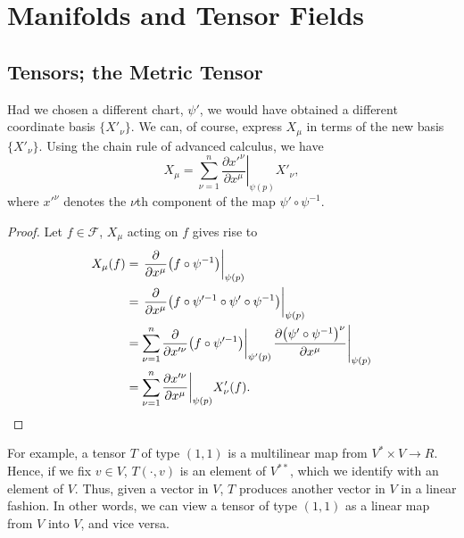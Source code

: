 \documentclass{note}
\numberwithin{equation}{chapter}
\newcommand{\vat}[2]{\left.#1\right\rvert_{#2}}
\newcommand{\pdv}[2]{\frac{\partial #1}{\partial #2}}
\newcommand{\pdvf}[2]{\frac{\partial}{\partial #1}\prn{#2}}
\begin{document}
\chapter{Manifolds and Tensor Fields}

\setcounter{section}{2}
\section{Tensors; the Metric Tensor}


\begin{quotebar}
    Had we chosen a different chart, $\mathtt{\psi}'$, we would have obtained a
    different coordinate basis $\{X'_\nu\}$. We can, of course, express $X_\mu$ in
    terms of the new basis $\{X'_\nu\}$. Using the chain rule of advanced calculus,
    we have
    \begin{equation*}
        X_\mu = \sum_{\nu=1}^n \vat{\pdv{x'^\nu}{x^\mu}}{\psi(p)} X'_\nu,
    \end{equation*}
    where $x'^\nu$ denotes the $\nu$th component of the map $\psi'\circ\psi^{-1}$.
\end{quotebar}

\begin{proof}
    Let $f \in \mathscr{F}$, $X_\mu$ acting on $f$ gives rise to
    \begin{align*}
        X_\mu(f) & = \vat{\pdvf{x^\mu}{f\circ\psi^{-1}}}{\psi(p)}                          \\
                 & = \vat{\pdvf{x^\mu}{f\circ\psi'^{-1}\circ\psi'\circ\psi^{-1}}}{\psi(p)} \\
                 & = \sum_{\nu=1}^n \vat{\pdvf{x'^\nu}{f\circ\psi'^{-1}}}{\psi'(p)}
        \vat{\pdv{\prn{\psi'\circ\psi^{-1}}^\nu}{x^\mu}}{\psi(p)}                          \\
                 & = \sum_{\nu=1}^n \vat{\pdv{x'^\nu}{x^\mu}}{\psi(p)} \qedhere
        X'_\nu(f).
    \end{align*}
\end{proof}


\begin{quotebar}
    For example, a tensor $T$ of type $(1,1)$ is a multilinear map from $V^* \times
        V \to R$. Hence, if we fix $v \in V$, $T(\cdot,v)$ is an element of $V^{**}$,
    which we identify with an element of $V$. Thus, given a vector in $V$, $T$
    produces another vector in $V$ in a linear fashion. In other words, we can view
    a tensor of type $(1,1)$ as a linear map from $V$ into $V$, and vice versa.
\end{quotebar}
\end{document}
